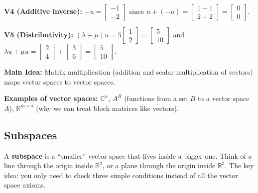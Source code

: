 \documentclass[11pt]{article}
\theoremstyle{definition}
\theoremstyle{plain}
\theoremstyle{remark}
\begin{document}
\begin{workedexample}[title=\textbf{Worked Example: $\mathbb{R}^2$ is a vector space}]
\textbf{V4 (Additive inverse):} $-u = \begin{bmatrix}-1\\-2\end{bmatrix}$ since $u + (-u) = \begin{bmatrix}1-1\\2-2\end{bmatrix} = \begin{bmatrix}0\\0\end{bmatrix}$. \checkmark

\textbf{V5 (Distributivity):}
$(\lambda + \mu)u = 5\begin{bmatrix}1\\2\end{bmatrix} = \begin{bmatrix}5\\10\end{bmatrix}$ and $\lambda u + \mu u = \begin{bmatrix}2\\4\end{bmatrix} + \begin{bmatrix}3\\6\end{bmatrix} = \begin{bmatrix}5\\10\end{bmatrix}$. \checkmark
\end{workedexample}

\textbf{Main Idea:} Matrix multiplication (addition and scalar multiplication of vectors) maps vector spaces to vector spaces.

\textbf{Examples of vector spaces:} $\mathbb{C}^n$, $A^B$ (functions from a set $B$ to a vector space $A$), $\mathbb{R}^{m \times n}$ (why we can treat block matrices like vectors).

\subsection{Subspaces}

\begin{intuitionbox}
A \textbf{subspace} is a ``smaller'' vector space that lives inside a bigger one. Think of a line through the origin inside $\mathbb{R}^2$, or a plane through the origin inside $\mathbb{R}^3$. The key idea: you only need to check three simple conditions instead of all the vector space axioms.
\end{intuitionbox}
\end{document}
